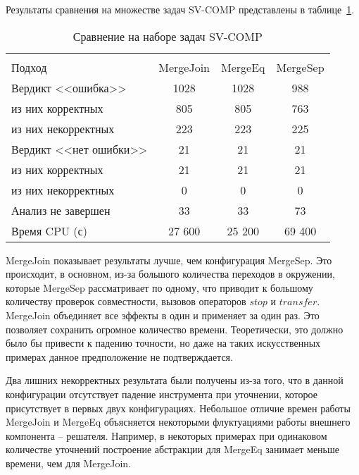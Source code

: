 Результаты сравнения на множестве задач SV-COMP представлены в таблице~\ref{table-sv-comp-merge}.

  \begin{table}[h]\footnotesize \centering
    \caption{Сравнение на наборе задач SV-COMP}
  	\label{table-sv-comp-merge}
    \begin{tabular}{ | l | c | c | c | }
      \hline
      		& 		\multicolumn{3}{c|}{\theory}  \\
      Подход         				& MergeJoin & MergeEq 	& MergeSep   \\ \hline
      Вердикт <<ошибка>> 				& 1028    	& 1028		& 988         \\ 
  \hspace{0.5cm} из них корректных 	& 805 		& 805 		& 763      \\ 
  \hspace{0.5cm} из них некорректных & 223 		& 223 		& 225        \\ \hline
      Вердикт <<нет ошибки>>  		& 21      	& 21        & 21       \\ 
  \hspace{0.5cm} из них корректных 	& 21 		& 21    	& 21        \\
  \hspace{0.5cm} из них некорректных & 0 		& 0    		& 0         \\ \hline
      Анализ не завершен       		& 33     	& 33        & 73       \\ \hline
      Время CPU (с)   				& 27 600 	& 25 200    & 69 400    \\ 
      \hline
    \end{tabular}
  \end{table}

MergeJoin показывает результаты лучше, чем конфигурация MergeSep.
Это происходит, в основном, из-за большого количества переходов в окружении, которые MergeSep рассматривает по одному, что приводит к большому количеству проверок совместности, вызовов операторов $stop$ и $transfer$.
MergeJoin объединяет все эффекты в один и применяет за один раз. Это позволяет сохранить огромное количество времени. Теоретически, это должно было бы привести к падению точности, но даже на таких искусственных примерах данное предположение не подтверждается.

Два лишних некорректных результата были получены из-за того, что в данной конфигурации отсутствует падение инструмента при уточнении, которое присутствует в первых двух конфигурациях.
Небольшое отличие времен работы MergeJoin и MergeEq объясняется некоторыми флуктуациями работы внешнего компонента -- решателя. 
Например, в некоторых примерах при одинаковом количестве уточнений построение абстракции для MergeEq занимает меньше времени, чем для MergeJoin.

